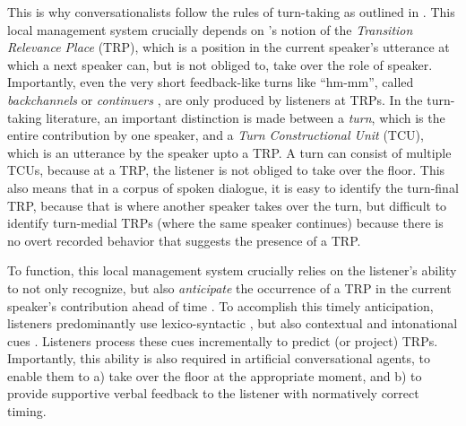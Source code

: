 This is why conversationalists follow the rules of turn-taking as outlined in \citet{sacks1974simplest} \citep[see also][]{Levinson1983Pragmatics, deRuiter2019TurnTaking}. This local management system crucially depends on \citeauthor{sacks1974simplest}'s notion of the \textit{Transition Relevance Place} (TRP), which is a position in the current speaker's utterance at which a next speaker can, but is not obliged to, take over the role of speaker. Importantly, even the very short feedback-like turns like ``hm-mm'', called \textit{backchannels} \citep{yngve1970backchannel} or \textit{continuers} \citep{schegloff1982discourse}, are  only produced by listeners at TRPs. In the turn-taking literature, an important distinction is made between a \textit{turn}, which is the entire contribution by one speaker, and a \textit{Turn Constructional Unit} (TCU), which is an utterance by the speaker upto a TRP. A turn can consist of multiple TCUs, because at a TRP, the listener is not obliged to take over the floor. This also means that in a corpus of spoken dialogue, it is easy to identify the turn-final TRP, because that is where another speaker takes over the turn, but difficult to identify turn-medial TRPs (where the same speaker continues) because there is no overt recorded behavior that suggests the presence of a TRP.

To function, this local management system crucially relies on the listener's ability to not only recognize, but also \textit{anticipate} the occurrence of a TRP in the current speaker's contribution ahead of time \cite{riest2015anticipation}. To accomplish this timely anticipation, listeners predominantly use lexico-syntactic \citep{deRuiter2006ProjectingTheEnd}, but also contextual and intonational cues \citep{boegels2021cues}. Listeners process these cues incrementally to predict (or project) TRPs. Importantly, this ability is also required in artificial conversational agents, to enable them to a) take over the floor at the appropriate moment, and b) to provide supportive verbal feedback to the listener with normatively correct timing.


